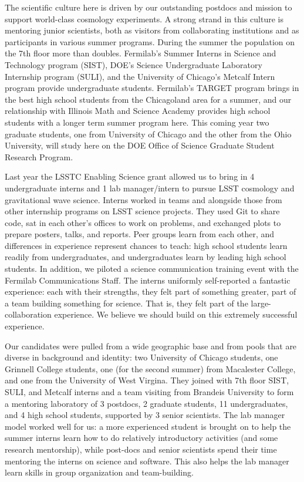 The scientific culture here is driven by our outstanding postdocs and mission to support
world-class cosmology experiments. A strong strand in this culture is mentoring
junior scientists, both  as visitors from collaborating institutions and as participants
in various summer programs.
During the summer the population on the 7th floor more than doubles.
Fermilab's Summer Interns in Science and Technology program (SIST),
DOE's Science Undergraduate Laboratory Internship program (SULI), and the University of
Chicago's Metcalf Intern program provide undergraduate students. 
Fermilab's TARGET program brings in the best high school 
students from the Chicagoland area for a summer, 
and our relationship with Illinois Math and Science Academy provides
high school students with a longer term summer program here.
This coming year two graduate students, one from University of Chicago and the
other from the Ohio University, will study here on the DOE Office of Science
Graduate Student Research Program.

Last year the LSSTC Enabling Science grant allowed us to bring in
4 undergraduate interns and 1 lab manager/intern to pursue LSST
cosmology and gravitational wave science. 
Interns worked in teams and alongside those from other internship programs on LSST science projects. 
They used Git to share code, sat in each other's offices to work on problems, and exchanged plots to prepare posters, talks, and reports. 
Peer groups learn from each other,
and differences in experience represent chances to teach: high school
students learn readily from undergraduates, and undergraduates learn
by leading high school students. 
In addition, we piloted a science communication training event with the Fermilab Communications Staff. %
The interns uniformly self-reported a fantastic experience: each with their strengths,
they felt part of something greater, part of a team building something 
for science. That is, they felt part of the large-collaboration experience.
We believe we should build on this extremely successful experience.

Our candidates were pulled from a wide geographic base and from pools that are diverse in background and identity:
two University of Chicago students, one Grinnell College students, 
one (for the second summer) from Macalester College, and
one from the University of West Virgina. They joined with 7th floor SIST, SULI,
and Metcalf interns and a team visiting from Brandeis University to form
a mentoring laboratory of 3 postdocs, 2 graduate students, 11 undergraduates, and 4
high school students,
supported by 3 senior scientists. The lab manager model worked well for us:
a more experienced student is brought on to help the summer interns
learn how to do relatively introductory activities (and some research mentorship), while post-docs and senior scientists spend
their time mentoring the interns on science and software.
This also helps the lab manager learn skills in group organization and team-building.

